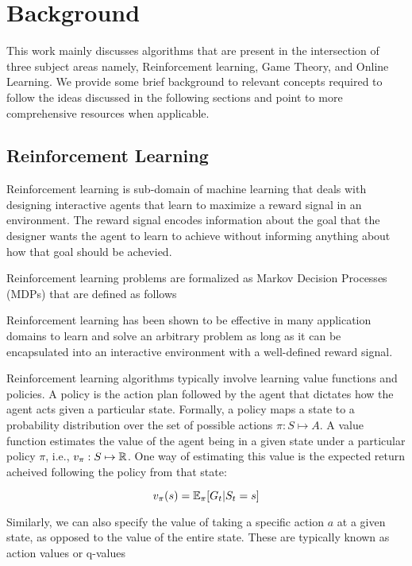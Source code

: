 \chapter{Background}
This work mainly discusses algorithms that are present in the intersection of three subject areas
namely, Reinforcement learning, Game Theory, and Online Learning.
We provide some brief background to relevant concepts required to follow the ideas discussed in the following sections 
and point to more comprehensive resources when applicable.

\section{Reinforcement
  Learning}

Reinforcement learning is sub-domain of machine learning that deals with designing interactive
agents that learn to maximize a reward signal in an environment.
The reward signal encodes information about the goal that the designer wants the agent to learn to
achieve without informing anything about how that goal should be achevied.

Reinforcement learning problems are formalized as Markov Decision Processes (MDPs) that are defined
as follows 


Reinforcement learning has been shown to be
effective in many application domains to learn and solve an arbitrary problem as long as it can be
encapsulated into an interactive environment with a well-defined reward signal.

Reinforcement learning algorithms typically involve learning value functions and policies.
A policy is the action plan followed by the agent that dictates how the agent acts given a
particular state.
Formally, a policy maps a state to a probability distribution over the set of possible actions
$\pi: S \mapsto A$.
A value function estimates the value of the agent being in a given state under 
a particular policy $\pi$, i.e., $v_{\pi}: S \mapsto \mathbb{R}$.
One way of estimating this value is the expected return acheived following the policy from that state:

$$ v_{\pi}(s) = \mathbb{E}_{\pi}[G_t | S_t = s]$$

Similarly, we can also specify the value of taking a specific action $a$ at a given state, as
opposed to the value of the entire state.
These are typically known as action values or q-values

